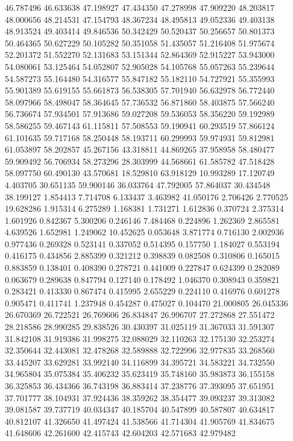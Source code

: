 46.787496
46.633638
47.198927
47.434350
47.278998
47.909220
48.203817
48.000656
48.214531
47.154793
48.367234
48.495813
49.052336
49.403138
48.913524
49.403414
49.846536
50.342429
50.520437
50.256657
50.801373
50.464365
50.627229
50.105282
50.351058
51.435057
51.216408
51.975674
52.201372
51.552270
52.131683
53.151344
52.864369
52.915227
53.943000
54.080061
53.125464
54.052807
52.905028
54.105768
55.057263
55.239644
54.587273
55.164480
54.316577
55.847182
55.182110
54.727921
55.355993
55.901389
55.619155
55.661873
56.538305
57.701940
56.632978
56.772440
58.097966
58.498047
58.364645
57.736532
56.871860
58.403875
57.566240
56.736674
57.934501
57.913686
59.027208
59.536053
58.356220
59.192989
58.586255
59.467143
61.115811
57.508553
59.190941
60.293519
57.866124
61.101635
59.717168
58.250448
58.193711
60.299993
59.974931
59.812981
61.053897
58.202857
45.267156
43.318811
44.869265
37.958958
58.480477
59.909492
56.706934
58.273296
28.303999
44.568661
61.585782
47.518428
58.097750
60.490130
43.570681
18.529810
63.918129
10.993289
17.120749
4.403705
30.651135
59.900146
36.033764
47.792005
57.864037
30.434548
38.199127
1.854413
7.714708
6.133437
3.463982
41.050176
2.706426
2.770525
19.628286
1.915314
6.275289
1.168381
1.731271
1.612836
0.370724
2.375314
1.601926
0.842367
5.300206
0.246146
7.484468
0.224896
1.262369
2.865581
4.639526
1.652981
1.249062
10.452625
0.053648
3.871774
0.716130
2.002936
0.977436
0.269328
0.523141
0.337052
0.514395
0.157750
1.184027
0.553194
0.416175
0.434856
2.885399
0.321212
0.398839
0.082508
0.310806
0.165015
0.883859
0.138401
0.408390
0.278721
0.441009
0.227847
0.624399
0.282089
0.063679
0.289638
0.847794
0.127140
0.178492
1.046370
0.308943
0.359821
0.283421
0.413330
0.867474
0.415995
2.655229
0.224110
0.416976
0.601278
0.905471
0.411741
1.237948
0.454287
0.475027
0.104470
21.000805
26.045336
26.670369
26.722521
26.769606
26.834847
26.996707
27.272868
27.551472
28.218586
28.990285
29.838526
30.430397
31.025119
31.367033
31.591307
31.842108
31.919386
31.998275
32.088029
32.110263
32.175130
32.253274
32.350644
32.443081
32.478268
32.589888
32.722996
32.977835
33.268560
33.445207
33.629281
33.992140
34.116899
34.395721
34.583221
34.732550
34.965804
35.075384
35.406232
35.623419
35.748160
35.983873
36.155158
36.325853
36.434366
36.743198
36.883414
37.238776
37.393095
37.651951
37.701777
38.104931
37.924436
38.359262
38.354477
39.093237
39.313082
39.081587
39.737719
40.034347
40.185704
40.547899
40.587807
40.634817
40.812107
41.326650
41.497424
41.538566
41.714304
41.905769
41.834675
41.648606
42.261600
42.415743
42.604203
42.571683
42.979482
